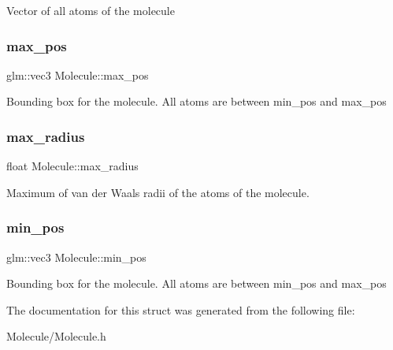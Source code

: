 Vector of all atoms of the molecule \mbox{\label{struct_molecule_a0ffe6af0a1ea4ff5cbbdd1a2a922253b}} 
\subsubsection{\texorpdfstring{max\_pos}{max\_pos}}
{\footnotesize\ttfamily glm\+::vec3 Molecule\+::max\+\_\+pos}

Bounding box for the molecule. All atoms are between min\+\_\+pos and max\+\_\+pos \mbox{\label{struct_molecule_a01e9bc4e0fc5fc24d8793434741dcfa3}} 
\subsubsection{\texorpdfstring{max\_radius}{max\_radius}}
{\footnotesize\ttfamily float Molecule\+::max\+\_\+radius}

Maximum of van der Waals radii of the atoms of the molecule. \mbox{\label{struct_molecule_a8a7e5c28190e929197dee74935604f67}} 
\subsubsection{\texorpdfstring{min\_pos}{min\_pos}}
{\footnotesize\ttfamily glm\+::vec3 Molecule\+::min\+\_\+pos}

Bounding box for the molecule. All atoms are between min\+\_\+pos and max\+\_\+pos 

The documentation for this struct was generated from the following file\+:\begin{DoxyCompactItemize}
\item 
Molecule/Molecule.\+h\end{DoxyCompactItemize}
